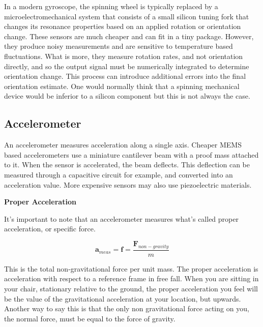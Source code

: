 In a modern gyroscope, the spinning
wheel is typically replaced by a microelectromechanical system that
consists of a small silicon tuning fork that changes its resonance properties
based on an applied rotation or orientation change. These sensors are much cheaper and
can fit in a tiny package. However, they produce
noisy measurements and are sensitive to temperature
based fluctuations. What is more, they measure rotation rates,
and not orientation directly, and so the output signal must be numerically
integrated to determine orientation change. This process can introduce additional
errors into the final orientation estimate.  One would normally think that a spinning
mechanical device would be inferior to a silicon component but
this is not always the case. 


\subsection{Accelerometer}

An accelerometer measures
acceleration along a single axis. Cheaper MEMS based accelerometers
use a miniature cantilever beam with a proof mass attached to it. When the sensor is accelerated,
the beam deflects. This deflection can be measured through
a capacitive circuit for example, and converted into an acceleration value. More expensive sensors may also
use piezoelectric materials. 


\begin{framed}
\theoremstyle{remark}
\begin{remark}{\textbf{Proper Acceleration }}

It's important to note that
an accelerometer measures what's called proper acceleration,
or specific force. 

\begin{equation}
\mathbf{a}_{meas} = \mathbf{f} = \frac{\mathbf{F}_{non-gravity}}{m}
\end{equation}

This is the total non-gravitational
force per unit mass. The proper acceleration is
acceleration with respect to a reference frame in free fall. When you are sitting in your chair,
stationary relative to the ground, the proper acceleration you feel will
be the value of the gravitational acceleration at your location,
but upwards. Another way to say this is that the only
non gravitational force acting on you, the normal force,
must be equal to the force of gravity.
\end{remark}
\end{framed}


